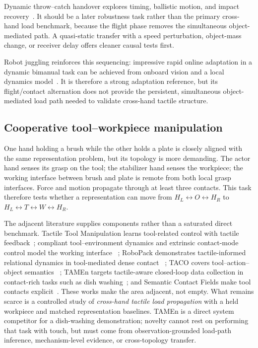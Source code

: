 Dynamic throw--catch handover explores timing, ballistic motion, and impact
recovery~\cite{huang2023dynamichandover}. It should be a later robustness task
rather than the primary cross-hand load benchmark, because the flight phase
removes the simultaneous object-mediated path. A quasi-static transfer with a
speed perturbation, object-mass change, or receiver delay offers cleaner causal
tests first.

Robot juggling reinforces this sequencing: impressive rapid online adaptation in
a dynamic bimanual task can be achieved from onboard vision and a local dynamics
model~\cite{lee2026robotjuggling}. It is therefore a strong adaptation reference,
but its flight/contact alternation does not provide the persistent, simultaneous
object-mediated load path needed to validate cross-hand tactile structure.

\subsection{Cooperative tool--workpiece manipulation}

One hand holding a brush while the other holds a plate is closely aligned with the
same representation problem, but its topology is more demanding. The actor hand
senses its grasp on the tool; the stabilizer hand senses the workpiece; the
working interface between brush and plate is remote from both local grasp
interfaces. Force and motion propagate through at least three contacts. This task
therefore tests whether a representation can move from
$H_L\!\leftrightarrow O\!\leftrightarrow H_R$ to
$H_L\!\leftrightarrow T\!\leftrightarrow W\!\leftrightarrow H_R$.

The adjacent literature supplies components rather than a saturated direct
benchmark. Tactile Tool Manipulation learns tool-related control with tactile
feedback~\cite{shirai2023tactiletool}; compliant tool--environment dynamics and
extrinsic contact-mode control model the working interface
~\cite{vandermerwe2022compliant,oller2024extrinsic}; RoboPack demonstrates
tactile-informed relational dynamics in tool-mediated dense contact
~\cite{ai2024robopack}; TACO covers tool--action--object semantics
~\cite{liu2024taco}; TAMEn targets tactile-aware closed-loop data collection in
contact-rich tasks such as dish washing~\cite{wu2026tamen}; and Semantic Contact
Fields make tool contacts explicit~\cite{ma2026semanticcontact}. These works make
the area adjacent, not empty. What remains scarce is a controlled study of
\emph{cross-hand tactile load propagation} with a held workpiece and matched
representation baselines. TAMEn is a direct system competitor for a dish-washing
demonstration; novelty cannot rest on performing that task with touch, but must
come from observation-grounded load-path inference, mechanism-level evidence, or
cross-topology transfer.

